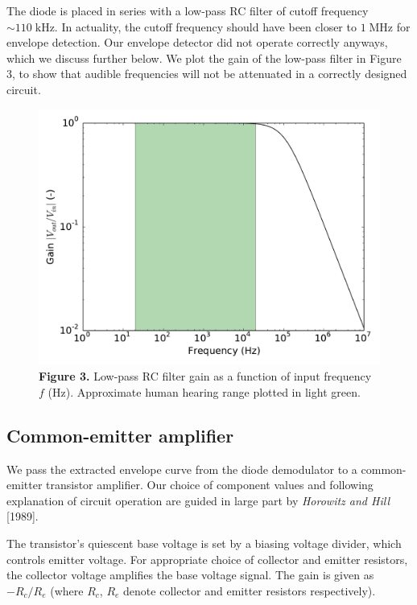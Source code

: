 \documentclass[11pt]{article}
\newcommand {\mt}{\mathrm}
\newcommand {\unit}[1]{\; \mt{#1}}
\begin{document}
The diode is placed in series with a low-pass RC filter of cutoff frequency
$\sim 110 \unit{kHz}$.  In actuality, the cutoff frequency should have been
closer to $1 \unit{MHz}$ for envelope detection.  Our envelope
detector did not operate correctly anyways, which we discuss further below.
We plot the gain of the low-pass filter in Figure 3, to show that audible
frequencies will not be attenuated in a correctly designed circuit.

\begin{figure}[h]
    \centering
    \includegraphics[scale=0.4]{scripts/diode_rc_lowpass_gain.pdf} \\
    \textbf{Figure 3.} Low-pass RC filter gain as a function of input frequency
    $f$ (Hz).  Approximate human hearing range plotted in light green.
\end{figure}

\subsection{Common-emitter amplifier}

We pass the extracted envelope curve from the diode demodulator to a
common-emitter transistor amplifier.  Our choice of component values and
following explanation of circuit operation are guided in large part by
\emph{Horowitz and Hill} [1989].

The transistor's quiescent base voltage is set by a biasing voltage divider,
which controls emitter voltage.  For appropriate choice of collector and
emitter resistors, the collector voltage amplifies the base voltage signal.
The gain is given as $-R_c / R_e$ (where $R_c$, $R_e$ denote collector and
emitter resistors respectively).
\end{document}
